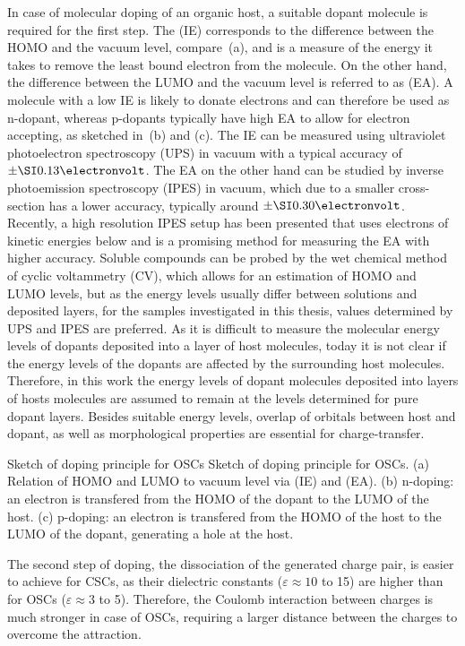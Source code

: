 In case of molecular doping of an organic host, a suitable dopant molecule is required for the first step.
The \IE (IE) corresponds to the difference between the HOMO and the vacuum level, compare \,(a), and is a measure of the energy it takes to remove the least bound electron from the molecule.
On the other hand, the difference between the LUMO and the vacuum level is referred to as \EA (EA).
A molecule with a low IE is likely to donate electrons and can therefore be used as n-dopant, whereas p-dopants typically have high EA to allow for electron accepting, as sketched in \,(b) and (c).
The IE can be measured using ultraviolet photoelectron spectroscopy (UPS) in vacuum with a typical accuracy of $\pm\eV{0.13}$\cite{SelinaOlthofDiss}. The EA on the other hand can be studied by inverse photoemission spectroscopy (IPES) in vacuum, which due to a smaller cross-section has a lower accuracy, typically around $\pm\eV{0.30}$. Recently, a high resolution IPES setup has been presented\cite{Yoshida2012} that uses electrons of kinetic energies below  and is a promising method for measuring the EA with higher accuracy.
Soluble compounds can be probed by the wet chemical method of cyclic voltammetry (CV), which allows for an estimation of HOMO and LUMO levels, but as the energy levels usually differ between solutions and deposited layers, for the samples investigated in this thesis, values determined by UPS and IPES are preferred.
%
As it is difficult to measure the molecular energy levels of dopants deposited into a layer of host molecules, today it is not clear if the energy levels of the dopants are affected by the surrounding host molecules. Therefore, in this work the energy levels of dopant molecules deposited into layers of hosts molecules are assumed to remain at the levels determined for pure dopant layers.
%
Besides suitable energy levels, overlap of orbitals between host and dopant, as well as morphological properties are essential for charge-transfer.

%
{Sketch of doping principle for OSCs}
{Sketch of doping principle for OSCs. (a) Relation of HOMO and LUMO to vacuum level via \IE (IE) and \EA (EA). (b) n-doping: an electron is transfered from the HOMO of the dopant to the LUMO of the host. (c) p-doping: an electron is transfered from the HOMO of the host to the LUMO of the dopant, generating a hole at the host.
}

The second step of doping, the dissociation of the generated charge pair, is easier to achieve for CSCs, as their dielectric constants ($\varepsilon\approx10$ to 15) are higher than for OSCs ($\varepsilon\approx3$ to 5)\cite{RiedeLuessemLeo2011}. Therefore, the Coulomb interaction between charges is much stronger in case of OSCs, requiring a larger distance between the charges to overcome the attraction.

